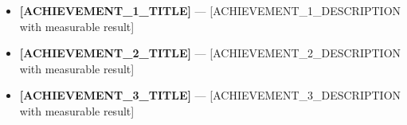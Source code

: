 \documentclass[11pt, a4paper]{\tpl/awesome-cv}
\begin{document}
\makecvfooter{}{}{}



\vspace{-2mm}


\begin{itemize}

\item \textbf{[ACHIEVEMENT_1_TITLE]} --- [ACHIEVEMENT_1_DESCRIPTION with measurable result]

\item \textbf{[ACHIEVEMENT_2_TITLE]} --- [ACHIEVEMENT_2_DESCRIPTION with measurable result]

\item \textbf{[ACHIEVEMENT_3_TITLE]} --- [ACHIEVEMENT_3_DESCRIPTION with measurable result]

\end{itemize}

\end{document}
